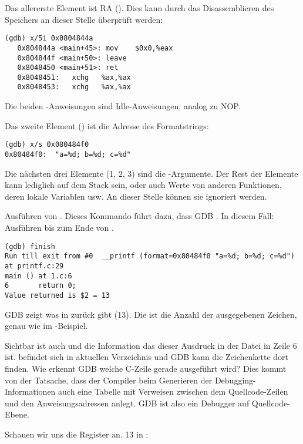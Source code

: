 Das allererste Element ist \ac{RA} ().
Dies kann durch das Disassemblieren des Speichers an dieser Stelle überprüft werden:

\begin{lstlisting}[label=NOP_as_XCHG_example,style=customasmx86]
(gdb) x/5i 0x0804844a
   0x804844a <main+45>:	mov    $0x0,%eax
   0x804844f <main+50>:	leave  
   0x8048450 <main+51>:	ret    
   0x8048451:	xchg   %ax,%ax
   0x8048453:	xchg   %ax,%ax
\end{lstlisting}

Die beiden -Anweisungen sind Idle-Anweisungen, analog zu \ac{NOP}.

Das zweite Element () ist die Adresse des Formatstrings:

\begin{lstlisting}
(gdb) x/s 0x080484f0
0x80484f0:	"a=%d; b=%d; c=%d"
\end{lstlisting}

Die nächsten drei Elemente (1, 2, 3) sind die \printf-Argumente.
Der Rest der Elemente kann lediglich  auf dem Stack sein,
oder auch Werte von anderen Funktionen, deren lokale Variablen usw.
An dieser Stelle können sie ignoriert werden.

Ausführen von .
Dieses Kommando führt dazu, dass GDB .
In diesem Fall: Ausführen bis zum Ende von \printf.

\begin{lstlisting}
(gdb) finish
Run till exit from #0  __printf (format=0x80484f0 "a=%d; b=%d; c=%d") at printf.c:29
main () at 1.c:6
6		return 0;
Value returned is $2 = 13
\end{lstlisting}

\ac{GDB} zeigt was \printf in \EAX zurück gibt (13).
Die ist die Anzahl der ausgegebenen Zeichen, genau wie im \olly-Beispiel.

Sichtbar ist auch  und die Information das dieser Ausdruck in der Datei  in Zeile 6 ist.
 befindet sich in aktuellen Verzeichnis und \ac{GDB} kann die Zeichenkette dort finden.
Wie erkennt \ac{GDB} welche C-Zeile gerade ausgeführt wird?
Dies kommt von der Tatsache, dass der Compiler beim Generieren der Debugging-Informationen auch eine
Tabelle mit Verweisen zwischen dem Quellcode-Zeilen und den Anweisungsadressen anlegt.
GDB ist also ein Debugger auf Quellcode-Ebene.

Schauen wir uns die Register an.
13 in \EAX:

